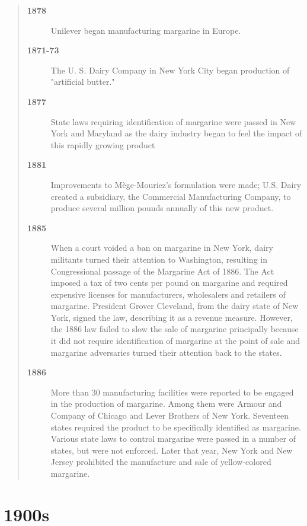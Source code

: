 \documentclass[serv,blindrev]{informs-serv}
\begin{document}
\begin{quotation}
\begin{description}
\item[\bf 1878] Unilever began manufacturing margarine in Europe.

\item[\bf 1871-73] The U. S. Dairy Company in New York City began
production of "artificial butter."

\item[\bf 1877] State laws requiring identification of margarine were
passed in New York and Maryland as the dairy industry began to feel
the impact of this rapidly growing product

\item[\bf 1881] Improvements to M\`ege-Mouriez's formulation were made;
U.S. Dairy created a subsidiary, the Commercial Manufacturing Company,
to produce several million pounds annually of this new product.

\item[\bf 1885] When a court voided a ban on margarine in New York,
dairy militants turned their attention to Washington, resulting in
Congressional passage of the Margarine Act of 1886. The Act imposed
a tax of two cents per pound on margarine and required expensive
licenses for manufacturers, wholesalers and retailers of margarine.
President Grover Cleveland, from the dairy state of New York, signed
the law, describing it as a revenue measure. However, the 1886 law
failed to slow the sale of margarine principally because it did not
require identification of margarine at the point of sale and
margarine adversaries turned their attention back to the states.

\item[\bf 1886] More than 30 manufacturing facilities were reported to
be engaged in the production of margarine. Among them were Armour
and Company of Chicago and Lever Brothers of New York. Seventeen
states required the product to be specifically identified as
margarine. Various state laws to control margarine were passed in a
number of states, but were not enforced. Later that year, New York
and New Jersey prohibited the manufacture and sale of yellow-colored
margarine.

\end{description}

\end{quotation}



\section{1900s}
\end{document}
